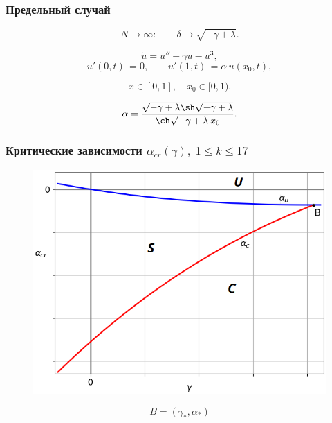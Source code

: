 \documentclass[fullscreen=true, unicode, bookmarks=false]{beamer}
\begin{document}
\begin{frame}
\frametitle{ Предельный случай }

$$ N \rightarrow \infty: \qquad \delta \rightarrow \sqrt{-\gamma + \lambda}. $$

\bigskip
\pause

\begin{equation}
	\dot{u} = u'' + \gamma u - u^3,	
\end{equation}
\begin{equation}
	u'(0, t) \, = 0, \qquad u'(1, t) \, = \alpha\,u(x_0, t),
\end{equation}

\smallskip

$$ x \in [0,1] ,\quad  x_0 \in [0, 1). $$

\bigskip
\pause

\begin{equation}
\alpha = \dfrac{\sqrt{-\gamma+\lambda}\sh\sqrt{-\gamma+\lambda}}{\ch\sqrt{-\gamma+\lambda}\:x_0}.
\end{equation}

\end{frame}

\begin{frame}
\frametitle{ Критические зависимости $ \alpha_{cr}(\gamma), \; 1 \leqslant k \leqslant 17 $ }

\begin{figure} 
\includegraphics[scale=0.59]{scheme0117.png}  
\end{figure}
$$ B=(\gamma_*, \alpha_*) $$

\end{frame}
\end{document}

